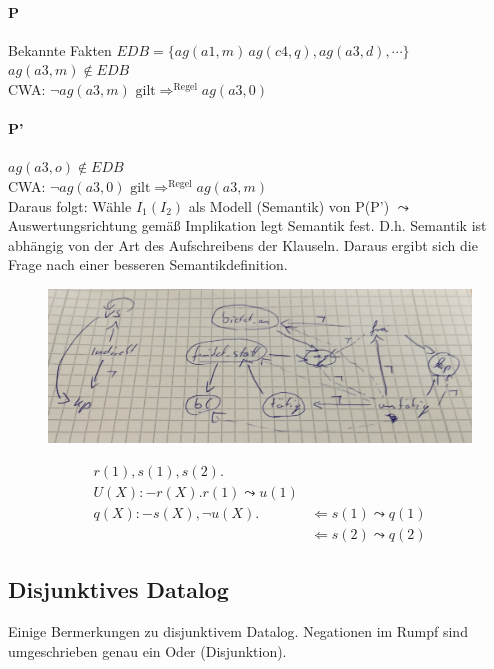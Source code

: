 \documentclass[12pt, a4paper]{article}
\begin{document}
\paragraph{P}
Bekannte Fakten $EDB = \{ ag(a1,m)\, ag(c4,q), ag(a3,d), \cdots \}$ \\
$ag(a3, m) \not \in EDB$ \\
CWA: $\lnot ag(a3, m) \text{ gilt} \Rightarrow^{\text{Regel}} ag(a3,0)$ \\

\paragraph{P'}
$ag(a3, o) \not \in EDB$ \\
CWA: $\lnot ag(a3, 0) \text{ gilt} \Rightarrow^{\text{Regel}} ag(a3,m)$ \\

Daraus folgt: Wähle $I_1(I_2)$ als Modell (Semantik) von P(P') $\leadsto$ Auswertungsrichtung gemäß Implikation legt Semantik fest. D.h. Semantik ist abhängig von der Art des Aufschreibens der Klauseln. Daraus ergibt sich die Frage nach einer besseren Semantikdefinition.

\begin{figure}
\centering
\includegraphics[width=0.95\linewidth]{img/img15}
\caption{}
\label{fig:img15}
\end{figure}

\begin{align*}
r(1), s(1), s(2).& \\
U(X) :- r(X). r(1) \leadsto u(1)& \\
q(X) :- s(X), \lnot u(X).& \Leftarrow s(1) \leadsto q(1)\\
& \Leftarrow s(2) \leadsto q(2)
\end{align*}

\subsection*{Disjunktives Datalog}
Einige Bermerkungen zu disjunktivem Datalog. Negationen im Rumpf sind umgeschrieben genau ein Oder (Disjunktion).
\end{document}
